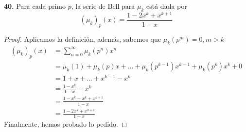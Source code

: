 \documentclass{article}
\newenvironment{statement}[1]{\smallskip\noindent\color[rgb]{1.00,0.00,0.50} {\bf #1.}}{}
\theoremstyle{definition}
\theoremstyle{remark}
\begin{document}
\begin{statement}{40}
Para cada primo $p$, la serie de Bell para $\mu_k$ est\'a dada por
$$(\mu_k)_p(x) = \frac{1 - 2x^k + x^{k+1}}{1-x}$$
\end{statement}
\begin{proof}
Aplicamos la definici\'on, adem\'as, sabemos que $\mu_k(p^m) = 0, m > k$
\begin{align*}
    (\mu_k)_p(x) &= \sum_{n = 0}^{\infty} \mu_k(p^n)x^n\\
    &= \mu_k(1) + \mu_k(p)x + \dots + \mu_k(p^{k - 1})x^{k - 1} + \mu_k(p^k)x^k + 0\\
    &= 1 + x + \dots + x^{k - 1} - x^k\\
    &= \frac{1 - x^k}{1 - x} - x^k\\
    &= \frac{1 - x^k - x^k + x^{k + 1}}{1 - x}\\
    &= \frac{1 - 2x^k + x^{k + 1}}{1 - x}
\end{align*}
Finalmente, hemos probado lo pedido.
\end{proof}
\end{document}
